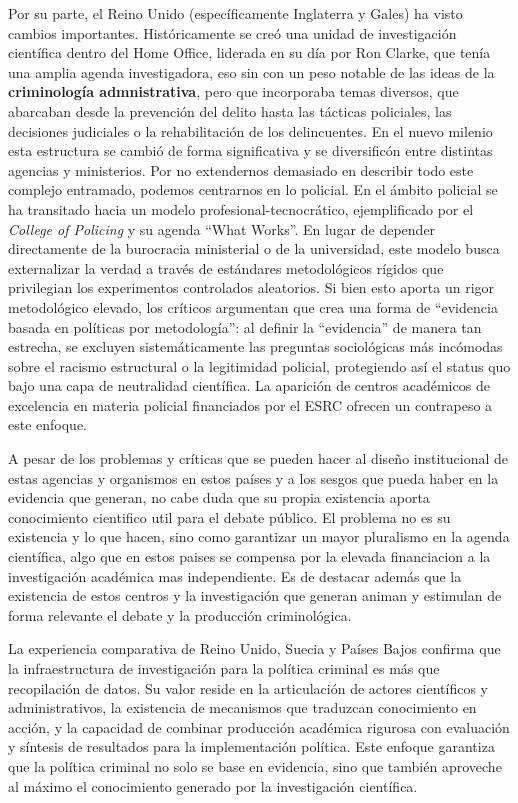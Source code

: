 \documentclass[
  spanish,
  letterpaper,
  DIV=11,
  numbers=noendperiod]{scrreprt}
\begin{document}
Por su parte, el Reino Unido (específicamente Inglaterra y Gales) ha
visto cambios importantes. Históricamente se creó una unidad de
investigación científica dentro del Home Office, liderada en su día por
Ron Clarke, que tenía una amplia agenda investigadora, eso sin con un
peso notable de las ideas de la \textbf{criminología admnistrativa},
pero que incorporaba temas diversos, que abarcaban desde la prevención
del delito hasta las tácticas policiales, las decisiones judiciales o la
rehabilitación de los delincuentes. En el nuevo milenio esta estructura
se cambió de forma significativa y se diversificón entre distintas
agencias y ministerios. Por no extendernos demasiado en describir todo
este complejo entramado, podemos centrarnos en lo policial. En el ámbito
policial se ha transitado hacia un modelo profesional-tecnocrático,
ejemplificado por el \emph{College of Policing} y su agenda ``What
Works''. En lugar de depender directamente de la burocracia ministerial
o de la universidad, este modelo busca externalizar la verdad a través
de estándares metodológicos rígidos que privilegian los experimentos
controlados aleatorios. Si bien esto aporta un rigor metodológico
elevado, los críticos argumentan que crea una forma de ``evidencia
basada en políticas por metodología'': al definir la ``evidencia'' de
manera tan estrecha, se excluyen sistemáticamente las preguntas
sociológicas más incómodas sobre el racismo estructural o la legitimidad
policial, protegiendo así el status quo bajo una capa de neutralidad
científica. La aparición de centros académicos de excelencia en materia
policial financiados por el ESRC ofrecen un contrapeso a este enfoque.

A pesar de los problemas y críticas que se pueden hacer al diseño
institucional de estas agencias y organismos en estos países y a los
sesgos que pueda haber en la evidencia que generan, no cabe duda que su
propia existencia aporta conocimiento cientifico util para el debate
público. El problema no es su existencia y lo que hacen, sino como
garantizar un mayor pluralismo en la agenda científica, algo que en
estos paises se compensa por la elevada financiacion a la investigación
académica mas independiente. Es de destacar además que la existencia de
estos centros y la investigación que generan animan y estimulan de forma
relevante el debate y la producción criminológica.

La experiencia comparativa de Reino Unido, Suecia y Países Bajos
confirma que la infraestructura de investigación para la política
criminal es más que recopilación de datos. Su valor reside en la
articulación de actores científicos y administrativos, la existencia de
mecanismos que traduzcan conocimiento en acción, y la capacidad de
combinar producción académica rigurosa con evaluación y síntesis de
resultados para la implementación política. Este enfoque garantiza que
la política criminal no solo se base en evidencia, sino que también
aproveche al máximo el conocimiento generado por la investigación
científica.
\end{document}
